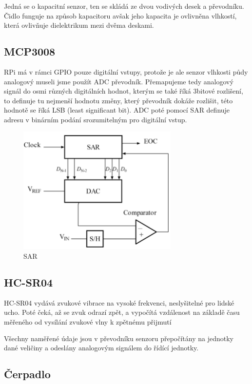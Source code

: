 \documentclass[11pt,a4paper]{article}
\begin{document}
Jedná se o kapacitní senzor, ten se skládá ze dvou vodivých desek a převodníku.
Čidlo funguje na způsob kapacitoru avšak jeho kapacita je ovlivněna vlhkostí,
která ovlivňuje dielektrikum mezi dvěma deskami.

\subsection{MCP3008}

RPi má v rámci GPIO pouze digitální vstupy, protože je ale senzor vlhkosti půdy
analogový museli jsme použít ADC převodník. Přemapujeme tedy analogový signál
do
osmi různých digitálních hodnot, kterým se také říká 3bitové rozlišení, to
definuje tu nejmenší hodnotu změny, který převodník dokáže rozlišit, této
hodnotě se říká LSB (least significant bit). ADC poté pomocí SAR
definuje adresu v binárním podání srozumitelným pro digitální vstup.

\begin{figure}[h]
	\centering
	\includegraphics[width=8cm]{sar_adc.png}
	\caption{SAR}
\end{figure}
\subsection{HC-SR04}

HC-SR04 vydává zvukové vibrace na vysoké frekvenci, neslyšitelné pro lidské
ucho. Poté čeká, až se zvuk odrazí zpět, a vypočítá vzdálenost na základě času
měřeného od vysílání zvukové vlny k zpětnému přijmutí

Všechny naměřené údaje jsou v převodníku senzoru přepočítány na jednotky dané
veličiny a odeslány analogovým signálem do řídící jednotky.

\subsection{Čerpadlo}
\end{document}
